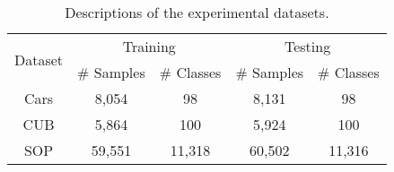 \documentclass[lettersize,journal]{IEEEtran}
\begin{document}
\begin{table}[]
		\caption{Descriptions of the experimental datasets.}
		\renewcommand{\arraystretch}{1.5}
		\centering
	\begin{tabular}{c|cc|cc}
		\hline
		\multirow{2}{*}{Dataset} & \multicolumn{2}{c|}{Training} & \multicolumn{2}{c}{Testing} \\ \cline{2-3}  \cline{4-5} 
		& \# Samples     & \# Classes    & \# Samples    & \# Classes    \\ \hline \hline 
		Cars                 &     8,054          &     98         &       8,131       &      98        \\
		CUB             &     5,864          &      100        &      5,924        &        100      \\
		SOP &       59,551        &       11,318       &     60,502         &        11,316      \\ \hline
	\end{tabular}
\label{data}
\end{table}
\end{document}
